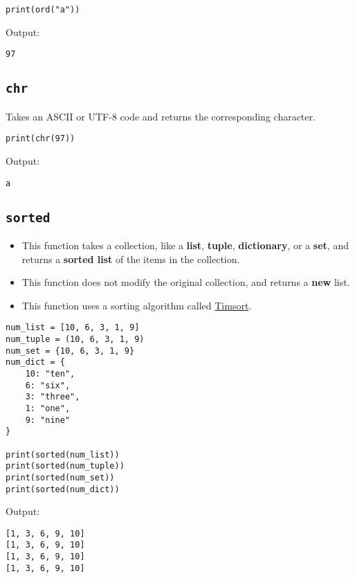 \documentclass[11pt]{article}
\begin{document}
\begin{verbatim}
print(ord("a"))
\end{verbatim}

 \noindent Output:

\begin{verbatim}
97
\end{verbatim}

\subsection{\texttt{chr}}
\label{sec:orgcc0fa40}
Takes an ASCII or UTF-8 code and returns the corresponding character.

\begin{verbatim}
print(chr(97))
\end{verbatim}

 \noindent Output:

\begin{verbatim}
a
\end{verbatim}


 \newpage

\subsection{\texttt{sorted}}
\label{sec:orgc8c9a0f}
\begin{itemize}
\item This function takes a collection, like a \textbf{list}, \textbf{tuple}, \textbf{dictionary}, or a \textbf{set}, and returns a \textbf{sorted list} of the items in the collection.
\item This function does not modify the original collection, and returns a \textbf{new} list.
\item This function uses a sorting algorithm called \href{https://en.wikipedia.org/wiki/Timsort}{Timsort}.
\end{itemize}

\begin{verbatim}
num_list = [10, 6, 3, 1, 9]
num_tuple = (10, 6, 3, 1, 9)
num_set = {10, 6, 3, 1, 9}
num_dict = {
    10: "ten",
    6: "six",
    3: "three",
    1: "one",
    9: "nine"
}

print(sorted(num_list))
print(sorted(num_tuple))
print(sorted(num_set))
print(sorted(num_dict))
\end{verbatim}

 \noindent Output:

\begin{verbatim}
[1, 3, 6, 9, 10]
[1, 3, 6, 9, 10]
[1, 3, 6, 9, 10]
[1, 3, 6, 9, 10]
\end{verbatim}
\end{document}
